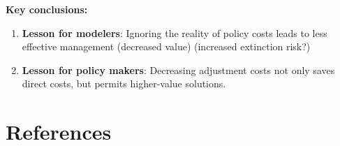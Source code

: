 \documentclass[authoryear, review, 12pt]{elsarticle}
\begin{document}
\textbf{Key conclusions:}
\begin{enumerate}
  \item \textbf{Lesson for modelers}: Ignoring the reality of policy costs leads to less effective management (decreased value)  (increased extinction risk?)
  \item \textbf{Lesson for policy makers}: Decreasing adjustment costs not only saves direct costs, but permits higher-value solutions.
\end{enumerate}


\section*{References}

\end{document}
